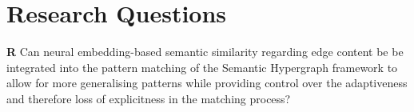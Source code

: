 \documentclass[11pt]{scrreprt}
\begin{document}





\section{Research Questions}

\textbf{R} Can neural embedding-based semantic similarity regarding edge content be be integrated into the pattern matching of the Semantic Hypergraph framework to allow for more generalising patterns while providing control over the adaptiveness and therefore loss of explicitness in the matching process?
\end{document}
